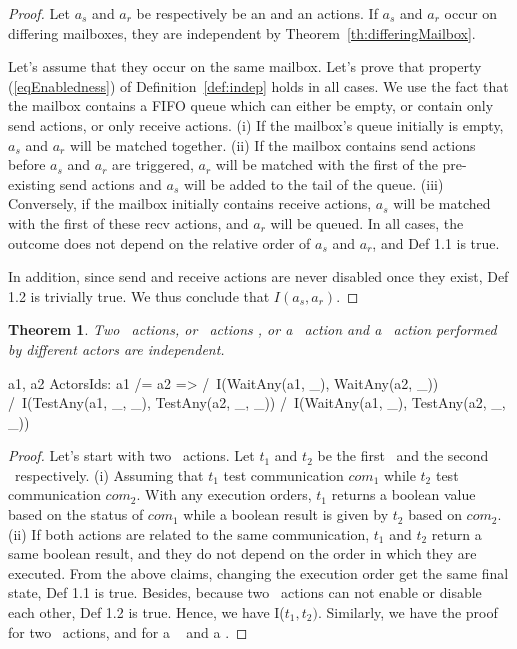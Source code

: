 \documentclass[a4paper,11pt]{article}
\theoremstyle{break}
\newtheorem{theorem}{Theorem}[section]
\begin{document}
\begin{proof}
Let $a_s$ and $a_r$ be respectively be an \asynsend and an \asynreceive actions. If $a_s$ and $a_r$ occur on differing mailboxes, they are independent by Theorem~\ref{th:differingMailbox}.
 
 Let's assume that they occur on the same mailbox. Let's prove that property (\ref{eqEnabledness}) of Definition~\ref{def:indep} holds in all cases. We use the fact that the mailbox contains a FIFO queue which can either be empty, or contain only send actions, or only receive actions.
(i) If the mailbox's queue initially is empty, $a_s$ and $a_r$ will be matched together. 
(ii) If the mailbox contains send actions before $a_s$ and $a_r$ are triggered, $a_r$ will be matched with the first of the pre-existing send actions and $a_s$ will be added to the tail of the queue. 
(iii) Conversely, if the mailbox initially contains receive actions, $a_s$ will be matched with the first of these recv actions, and $a_r$ will be queued.
In all cases, the outcome does not depend on the relative order of $a_s$ and $a_r$, and Def 1.1 is true. 

In addition, since send and receive actions are never disabled once they exist, Def 1.2 is trivially true. We thus conclude that $I(a_s, a_r)$.
\end{proof}

\begin{theorem}
Two \test~actions, or \wait~actions , or a \wait~action and a \test~action  performed by different actors are independent.
\end{theorem}
\begin{tla}
\forall a1, a2 \in ActorsIds: a1 /= a2 => 
	     /\ I(WaitAny(a1, _), WaitAny(a2, _))
	     /\ I(TestAny(a1, _, _), TestAny(a2, _, _))
	     /\ I(WaitAny(a1, _), TestAny(a2, _, _))   
\end{tla}
\begin{tlatex}
%
\end{tlatex}
\begin{proof}
 Let's start with two \test~actions. Let $t_1$ and $t_2$ be the first \test~and the second \wait~respectively. (i) Assuming that $t_1$ test communication $com_1$ while $t_2$ test communication $com_2$. With any execution orders,  $t_1$ returns a boolean value based on the status of $com_1$ while a boolean result is given by $t_2$ based on $com_2$. (ii) If both actions are related to the same communication, $t_1$ and $t_2$ return a same boolean result, and they do not depend on the order in which they are executed. From the above claims, changing the execution order get the same final state, Def 1.1 is true.  Besides, because two \test~actions can not enable or disable each other, Def 1.2 is true. Hence, we have I($t_1,t_2)$. Similarly, we have the proof for two \wait~actions, and for a \wait~ and a \test. 
\end{proof}
\end{document}
